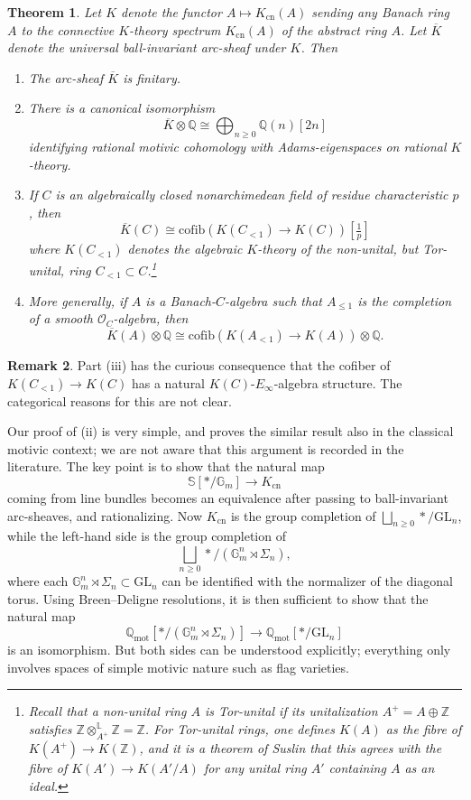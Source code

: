 \documentclass[11pt]{amsart}
\newcommand{\dotimes}{\otimes^{\mathbb L}}
\numberwithin{equation}{section}
\newtheorem{theorem}{Theorem}
\numberwithin{theorem}{section}
\theoremstyle{definition}
\newtheorem{remark}[theorem]{Remark}
\begin{document}
\begin{theorem} Let $K$ denote the functor $A\mapsto K_{\mathrm{cn}}(A)$ sending any Banach ring $A$ to the connective $K$-theory spectrum $K_{\mathrm{cn}}(A)$ of the abstract ring $A$. Let $\overline{K}$ denote the universal ball-invariant arc-sheaf under $K$. Then
\begin{enumerate}
\item[{\rm (i)}] The arc-sheaf $\overline{K}$ is finitary.
\item[{\rm (ii)}] There is a canonical isomorphism
\[
\overline{K}\otimes \mathbb Q\cong \bigoplus_{n\geq 0} \mathbb Q(n)[2n]
\]
identifying rational motivic cohomology with Adams-eigenspaces on rational $K$-theory.
\item[{\rm (iii)}] If $C$ is an algebraically closed nonarchimedean field of residue characteristic $p$, then
\[
\overline{K}(C)\cong \mathrm{cofib}(K(C_{<1})\to K(C))[\tfrac 1p]
\]
where $K(C_{<1})$ denotes the algebraic $K$-theory of the non-unital, but Tor-unital, ring $C_{<1}\subset C$.\footnote{Recall that a non-unital ring $A$ is Tor-unital if its unitalization $A^+ = A\oplus\mathbb Z$ satisfies $\mathbb Z\dotimes_{A^+} \mathbb Z = \mathbb Z$. For Tor-unital rings, one defines $K(A)$ as the fibre of $K(A^+)\to K(\mathbb Z)$, and it is a theorem of Suslin \cite{SuslinExcision} that this agrees with the fibre of $K(A')\to K(A'/A)$ for any unital ring $A'$ containing $A$ as an ideal.}
\item[{\rm (iv)}] More generally, if $A$ is a Banach-$C$-algebra such that $A_{\leq 1}$ is the completion of a smooth $\mathcal O_C$-algebra, then
\[
\overline{K}(A)\otimes \mathbb Q\cong \mathrm{cofib}(K(A_{<1})\to K(A))\otimes \mathbb Q.
\]
\end{enumerate}
\end{theorem}

\begin{remark} Part (iii) has the curious consequence that the cofiber of $K(C_{<1})\to K(C)$ has a natural $K(C)$-$E_\infty$-algebra structure. The categorical reasons for this are not clear.
\end{remark}

Our proof of (ii) is very simple, and proves the similar result also in the classical motivic context; we are not aware that this argument is recorded in the literature. The key point is to show that the natural map
\[
\mathbb S[\ast/\mathbb G_m]\to K_{\mathrm{cn}}
\]
coming from line bundles becomes an equivalence after passing to ball-invariant arc-sheaves, and rationalizing. Now $K_{\mathrm{cn}}$ is the group completion of $\bigsqcup_{n\geq 0} \ast/\mathrm{GL}_n$, while the left-hand side is the group completion of
\[
\bigsqcup_{n\geq 0}\ast/(\mathbb G_m^n\rtimes \Sigma_n),
\]
where each $\mathbb G_m^n\rtimes \Sigma_n\subset \mathrm{GL}_n$ can be identified with the normalizer of the diagonal torus. Using Breen--Deligne resolutions, it is then sufficient to show that the natural map
\[
\mathbb Q_{\mathrm{mot}}[\ast/(\mathbb G_m^n\rtimes \Sigma_n)]\to \mathbb Q_{\mathrm{mot}}[\ast/\mathrm{GL}_n]
\]
is an isomorphism. But both sides can be understood explicitly; everything only involves spaces of simple motivic nature such as flag varieties.
\end{document}
